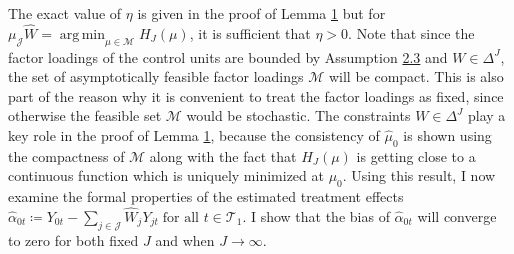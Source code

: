 \documentclass{article}
\DeclareMathOperator*{\argmin}{arg\,min}
\begin{document}
The exact value of $\eta$ is given in the proof of Lemma \hyperref[L1]{1} but for $\mu_{\mathcal{J}}\hat{W} = \argmin_{\mu \in \mathcal{M}} H_J(\mu)$, it is sufficient that $\eta > 0$. Note that since the factor loadings of the control units are bounded by Assumption \hyperref[A2]{2.3} and $W \in \Delta^J$, the set of asymptotically feasible factor loadings $\mathcal{M}$ will be compact. This is also part of the reason why it is convenient to treat the factor loadings as fixed, since otherwise the feasible set $\mathcal{M}$ would be stochastic. The constraints $W \in \Delta^J$ play a key role in the proof of Lemma \hyperref[L1]{1}, because the consistency of $\hat{\mu}_0$ is shown using the compactness of $\mathcal{M}$ along with the fact that $H_J(\mu)$ is getting close to a continuous function which is uniquely minimized at $\mu_0$. Using this result, I now examine the formal properties of the estimated treatment effects $\hat{\alpha}_{0t} \coloneqq Y_{0t} - \sum_{j \in \mathcal{J}} \hat{W}_j Y_{jt} \; \text{for all } t \in \mathcal{T}_1$. I show that the bias of $\hat{\alpha}_{0t}$ will converge to zero for both fixed $J$ and when $J \rightarrow \infty$.
\end{document}
